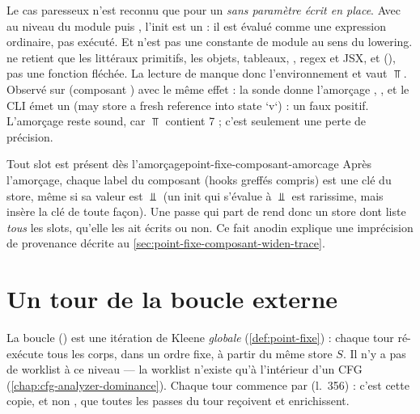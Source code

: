 \begin{piege}
Le cas paresseux n'est reconnu que pour un  \emph{sans paramètre
écrit en place}. Avec  au niveau du module
puis , l'init est un  : il est évalué comme
une expression ordinaire, pas exécuté. Et  n'est pas une
constante de module au sens du lowering.  ne retient
que les littéraux primitifs, les objets, tableaux, , regex et JSX,
et  (), pas une
fonction fléchée. La lecture de  manque donc l'environnement
et vaut $\Top$. Observé sur  (composant
) avec le même effet  : la sonde
donne l'amorçage , , et le CLI émet un
\Warning{}  (\og may store a fresh reference into state
`v`\fg) : un faux positif. L'amorçage reste sound, car $\Top$ contient 7 ;
c'est seulement une perte de précision.
\end{piege}

\begin{invariant}{Tout slot est présent dès l'amorçage}{point-fixe-composant-amorcage}
Après l'amorçage, chaque label  du composant (hooks greffés
compris) est une clé du store, même si sa valeur est $\Bot$ (un init qui
s'évalue à $\Bot$ est rarissime, mais  insère la clé de toute
façon). Une passe qui part de  rend donc un store dont
 liste \emph{tous} les slots, qu'elle les ait écrits ou non.
Ce fait anodin explique une imprécision de provenance décrite au
\cref{sec:point-fixe-composant-widen-trace}.
\end{invariant}

\section{Un tour de la boucle externe}
\label{sec:point-fixe-composant-tour}

La boucle () est une itération de
Kleene \emph{globale} (\cref{def:point-fixe}) : chaque tour ré-exécute tous
les corps, dans un ordre fixe, à partir du même store $S$. Il n'y a pas de
worklist à ce niveau --- la worklist n'existe qu'à l'intérieur d'un CFG
(\cref{chap:cfg-analyzer-dominance}). Chaque tour commence par
 (l.~356) : c'est cette copie, et
non , que toutes les passes du tour reçoivent et enrichissent.

